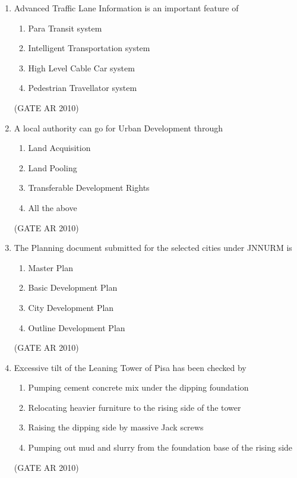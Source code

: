 \documentclass[journal]{IEEEtran}
\begin{document}
\begin{enumerate}
\item Advanced Traffic Lane Information is an important feature of
\begin{multicols}{2}
\begin{enumerate}
\item Para Transit system
\item Intelligent Transportation system
\item High Level Cable Car system
\item Pedestrian Travellator system
\end{enumerate}
\end{multicols}
\hfill (GATE AR 2010)

\item A local authority can go for Urban Development through
\begin{multicols}{2}
\begin{enumerate}
\item Land Acquisition
\item Land Pooling
\item Transferable Development Rights
\item All the above
\end{enumerate}
\end{multicols}
\hfill (GATE AR 2010)

\item The Planning document submitted for the selected cities under JNNURM is
\begin{multicols}{2}
\begin{enumerate}
\item Master Plan
\item Basic Development Plan
\item City Development Plan
\item Outline Development Plan
\end{enumerate}
\end{multicols}
\hfill (GATE AR 2010)

\item Excessive tilt of the Leaning Tower of Pisa has been checked by
\begin{enumerate}
\item Pumping cement concrete mix under the dipping foundation
\item Relocating heavier furniture to the rising side of the tower
\item Raising the dipping side by massive Jack screws
\item Pumping out mud and slurry from the foundation base of the rising side
\end{enumerate}
\hfill (GATE AR 2010)


\end{enumerate}
\end{document}
